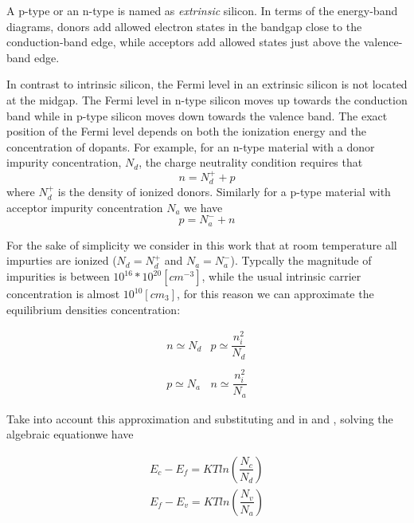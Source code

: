 A p-type or an n-type is named as \textit{extrinsic} silicon.
In terms of the energy-band diagrams, donors add allowed electron states in the bandgap close to the conduction-band edge, while acceptors add allowed states just above the valence-band edge.

In contrast to intrinsic silicon, the Fermi level in an extrinsic silicon is not located at the midgap. The Fermi level in n-type silicon moves up towards the conduction band while in p-type silicon moves down towards the valence band.
The exact position of the Fermi level depends on both the ionization energy and the concentration of dopants. For example, for an n-type material with a donor impurity concentration, $N_d$, the charge neutrality condition requires that
\begin{equation}
\label{eq: equilibrium charge in n-type}
n = N_d^+ + p
\end{equation}
 where $N_d^+$ is the density of ionized donors.  Similarly for a p-type material with acceptor impurity concentration $N_a$ we have
\begin{equation}
\label{eq: equilibrium charge in p-type}
p = N_a^- + n
\end{equation}
 
 For the sake of simplicity we consider in this work that at room temperature all impurties are ionized ($N_d = N_d^+$ and $N_a = N_a^-$). Typcally the magnitude of impurities is between $10^{16}\ast 10^{20} [cm^{-3}]$, while the usual intrinsic carrier concentration is almost $10^{10}[cm_3]$, for this reason we can approximate the equilibrium densities concentration:
  
\begin{equation}
\begin{array}{ll}
n \simeq N_d & p \simeq \dfrac{n_i^2}{N_d} \\ \\
p \simeq N_a & n \simeq \dfrac{n_i^2}{N_a}
\end{array}
\end{equation}

 Take into account this approximation and substituting  and  in  and , solving the algebraic equationwe have
 
 \begin{align}
 E_c-E_f = KTln\left(\dfrac{N_c}{N_d}\right)  \label{eq: Ef in n-type}\\
 E_f-E_v= KTln\left(\dfrac{N_v}{N_a}\right) \label{eq: Ef in p-type}
 \end{align}


